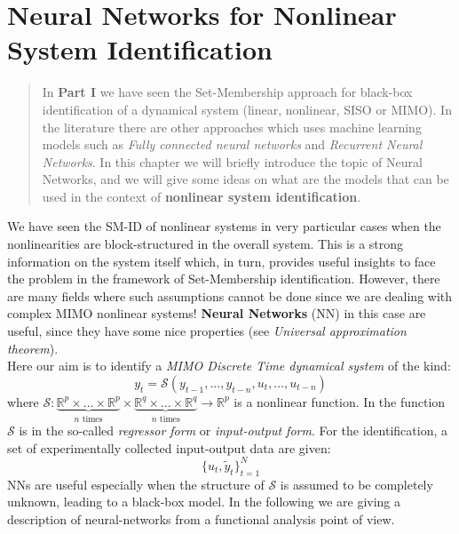 \chapter[Neural networks for nonlinear SysId]{Neural Networks for Nonlinear System Identification}
\begin{quotation}
    \noindent
    \textsf{In \textbf{Part I} we have seen the Set-Membership approach for black-box identification of a dynamical system (linear, nonlinear, SISO or MIMO). In the literature there are other approaches which uses machine learning models such as \textit{Fully connected neural networks} and \textit{Recurrent Neural Networks}. In this chapter we will briefly introduce the topic of Neural Networks, and we will give some ideas on what are the models that can be used in the context of \textbf{nonlinear system identification}.}
\end{quotation}

\noindent
We have seen the SM-ID of nonlinear systems in very particular cases when the nonlinearities are block-structured in the overall system. This is a strong information on the system itself which, in turn, provides useful insights to face the problem in the framework of Set-Membership identification. However, there are many fields where such assumptions cannot be done since we are dealing with complex MIMO nonlinear systems! \textbf{Neural Networks} (NN) in this case are useful, since they have some nice properties (see \textit{Universal approximation theorem}).\\
Here our aim is to identify a \textit{MIMO Discrete Time dynamical system} of the kind:
\begin{equation} \label{eq:regressor_form}
    y_t=\mathcal{S}({
        y_{t-1}, ..., y_{t-n}, u_t,..., u_{t-n}
    })
\end{equation}
where $\mathcal{S}:
\underbrace{
    \mathbb{R}^p \times \dots \times \mathbb{R}^p
}_{n \text{ times}} \times \underbrace{
    \mathbb{R}^q \times \dots \times \mathbb{R}^q
}_{n \text{ times}} \to \mathbb{R}^p$ is a nonlinear function. In  the function $\mathcal{S}$ is in the so-called \textit{regressor form} or \textit{input-output form}. For the identification, a set of experimentally collected input-output data are given:
\begin{equation*}
    \{u_t,\tilde{y}_t\}_{t=1}^N
\end{equation*} 
NNs are useful especially when the structure of $\mathcal{S}$ is assumed to be completely unknown, leading to a black-box model. In the following we are giving a description of neural-networks from a functional analysis point of view.
 

